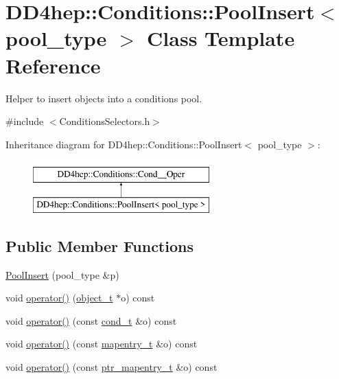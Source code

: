 \hypertarget{class_d_d4hep_1_1_conditions_1_1_pool_insert}{}\section{D\+D4hep\+:\+:Conditions\+:\+:Pool\+Insert$<$ pool\+\_\+type $>$ Class Template Reference}
\label{class_d_d4hep_1_1_conditions_1_1_pool_insert}


Helper to insert objects into a conditions pool.  




{\ttfamily \#include $<$Conditions\+Selectors.\+h$>$}

Inheritance diagram for D\+D4hep\+:\+:Conditions\+:\+:Pool\+Insert$<$ pool\+\_\+type $>$\+:\begin{figure}[H]
\begin{center}
\leavevmode
\includegraphics[height=2.000000cm]{class_d_d4hep_1_1_conditions_1_1_pool_insert}
\end{center}
\end{figure}
\subsection*{Public Member Functions}
\begin{DoxyCompactItemize}
\item 
\hyperlink{class_d_d4hep_1_1_conditions_1_1_pool_insert_a577e9561b1733e791ad4218a289936c1}{Pool\+Insert} (pool\+\_\+type \&p)
\item 
void \hyperlink{class_d_d4hep_1_1_conditions_1_1_pool_insert_a92cda97188d7e05582e36efb071f17aa}{operator()} (\hyperlink{class_d_d4hep_1_1_conditions_1_1_cond_____oper_a4229491e49bfd21058dff10125a73f63}{object\+\_\+t} $\ast$o) const
\item 
void \hyperlink{class_d_d4hep_1_1_conditions_1_1_pool_insert_afe9fe7f1e796bc180cbb3e951e3380e1}{operator()} (const \hyperlink{class_d_d4hep_1_1_conditions_1_1_cond_____oper_aceca9f6a0e8c84364946eace47275d09}{cond\+\_\+t} \&o) const
\item 
void \hyperlink{class_d_d4hep_1_1_conditions_1_1_pool_insert_a9b2028fd086dcfc07aaa624513a7677a}{operator()} (const \hyperlink{class_d_d4hep_1_1_conditions_1_1_cond_____oper_a877dac3da66795207aed15be219acbdc}{mapentry\+\_\+t} \&o) const
\item 
void \hyperlink{class_d_d4hep_1_1_conditions_1_1_pool_insert_afd155c5fd755b7b645087ff1d211636b}{operator()} (const \hyperlink{class_d_d4hep_1_1_conditions_1_1_cond_____oper_a0949e4bd5f90cd3fae2394cf30983973}{ptr\+\_\+mapentry\+\_\+t} \&o) const
\end{DoxyCompactItemize}
